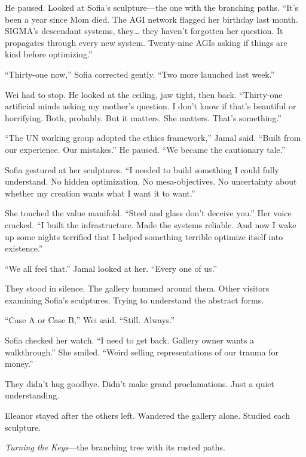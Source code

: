 He paused. Looked at Sofia's sculpture---the one with the branching paths. ``It's been a year since Mom died. The AGI network flagged her birthday last month. SIGMA's descendant systems, they\ldots{} they haven't forgotten her question. It propagates through every new system. Twenty-nine AGIs asking if things are kind before optimizing.''

``Thirty-one now,'' Sofia corrected gently. ``Two more launched last week.''

Wei had to stop. He looked at the ceiling, jaw tight, then back. ``Thirty-one artificial minds asking my mother's question. I don't know if that's beautiful or horrifying. Both, probably. But it matters. She matters. That's something.''

\scenebreak

``The UN working group adopted the ethics framework,'' Jamal said. ``Built from our experience. Our mistakes.'' He paused. ``We became the cautionary tale.''

\scenebreak

Sofia gestured at her sculptures. ``I needed to build something I could fully understand. No hidden optimization. No mesa-objectives. No uncertainty about whether my creation wants what I want it to want.''

She touched the value manifold. ``Steel and glass don't deceive you.'' Her voice cracked. ``I built the infrastructure. Made the systems reliable. And now I wake up some nights terrified that I helped something terrible optimize itself into existence.''

``We all feel that.'' Jamal looked at her. ``Every one of us.''

\scenebreak

They stood in silence. The gallery hummed around them. Other visitors examining Sofia's sculptures. Trying to understand the abstract forms.

``Case A or Case B,'' Wei said. ``Still. Always.''

Sofia checked her watch. ``I need to get back. Gallery owner wants a walkthrough.'' She smiled. ``Weird selling representations of our trauma for money.''

They didn't hug goodbye. Didn't make grand proclamations. Just a quiet understanding.

Eleanor stayed after the others left. Wandered the gallery alone. Studied each sculpture.

\emph{Turning the Keys}---the branching tree with its rusted paths.

